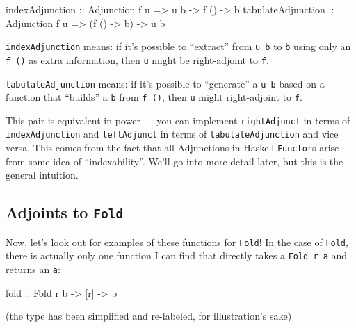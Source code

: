 \documentclass[]{article}
\newenvironment{Shaded}{}{}
\newcommand{\DataTypeTok}[1]{\textcolor[rgb]{0.56,0.13,0.00}{#1}}
\newcommand{\NormalTok}[1]{#1}
\newcommand{\OtherTok}[1]{\textcolor[rgb]{0.00,0.44,0.13}{#1}}
\begin{document}
\begin{Shaded}
\begin{Highlighting}[]
\OtherTok{indexAdjunction    ::} \DataTypeTok{Adjunction}\NormalTok{ f u }\OtherTok{=>}\NormalTok{ u b }\OtherTok{{-}>}\NormalTok{ f () }\OtherTok{{-}>}\NormalTok{ b}
\OtherTok{tabulateAdjunction ::} \DataTypeTok{Adjunction}\NormalTok{ f u }\OtherTok{=>}\NormalTok{ (f () }\OtherTok{{-}>}\NormalTok{ b) }\OtherTok{{-}>}\NormalTok{ u b}
\end{Highlighting}
\end{Shaded}

\texttt{indexAdjunction} means: if it's possible to ``extract'' from
\texttt{u\ b} to \texttt{b} using only an \texttt{f\ ()} as extra information,
then \texttt{u} might be right-adjoint to \texttt{f}.

\texttt{tabulateAdjunction} means: if it's possible to ``generate'' a
\texttt{u\ b} based on a function that ``builds'' a \texttt{b} from
\texttt{f\ ()}, then \texttt{u} might right-adjoint to \texttt{f}.

This pair is equivalent in power --- you can implement \texttt{rightAdjunct} in
terms of \texttt{indexAdjunction} and \texttt{leftAdjunct} in terms of
\texttt{tabulateAdjunction} and vice versa. This comes from the fact that all
Adjunctions in Haskell \texttt{Functor}s arise from some idea of
``indexability''. We'll go into more detail later, but this is the general
intuition.

\hypertarget{adjoints-to-fold}{%
\subsection{\texorpdfstring{Adjoints to
\texttt{Fold}}{Adjoints to Fold}}\label{adjoints-to-fold}}

Now, let's look out for examples of these functions for \texttt{Fold}! In the
case of \texttt{Fold}, there is actually only one function I can find that
directly takes a \texttt{Fold\ r\ a} and returns an \texttt{a}:

\begin{Shaded}
\begin{Highlighting}[]
\OtherTok{fold ::} \DataTypeTok{Fold}\NormalTok{ r b }\OtherTok{{-}>}\NormalTok{ [r] }\OtherTok{{-}>}\NormalTok{ b}
\end{Highlighting}
\end{Shaded}

(the type has been simplified and re-labeled, for illustration's sake)
\end{document}
